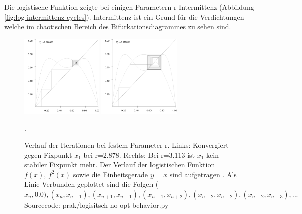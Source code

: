 \documentclass[12pt,a4paper]{article}
\begin{document}
Die logistische Funktion zeigte bei einigen Parametern r Intermittenz (Abbildung \ref{fig:log-intermittenz-cycles}). Intermittenz ist ein Grund für die Verdichtungen welche im chaotischen Bereich des Bifurkationsdiagrammes zu sehen sind.

\begin{figure}[!htbp]
\centering
\includegraphics[height=150px]{fixpunkt-2878}
\includegraphics[height=150px]{fixpunkt-311}
\caption{Verlauf der Iterationen bei festem Parameter r. Links: Konvergiert gegen Fixpunkt $x_1$ bei r=2.878. Rechts: Bei r=3.113 ist $x_1$ kein stabiler Fixpunkt mehr. Der Verlauf der logistischen Funktion $f(x)$, $f^2(x)$ sowie die Einheitsgerade $y=x$ sind aufgetragen . Als Linie Verbunden geplottet sind die Folgen ($x_n, 0.0), (x_n, x_{n+1}), (x_{n+1}, x_{n+1}), (x_{n+1}, x_{n+2}), (x_{n+2}, x_{n+2}), (x_{n+2}, x_{n+3}), ...$ Sourcecode: prak/logisitsch-no-opt-behavior.py}. 
\label{fig:log-iteration-behavior}
\end{figure}
\end{document}
